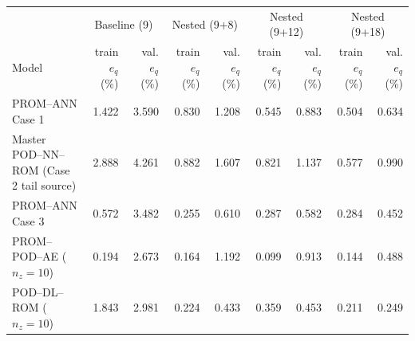 \begin{tabular}{lrr|rr|rr|rr}
\toprule
& \multicolumn{2}{c|}{Baseline (9)} & \multicolumn{2}{c|}{Nested (9+8)} & \multicolumn{2}{c|}{Nested (9+12)} & \multicolumn{2}{c}{Nested (9+18)} \\
Model & train $e_q$ (\%) & val. $e_q$ (\%) & train $e_q$ (\%) & val. $e_q$ (\%) & train $e_q$ (\%) & val. $e_q$ (\%) & train $e_q$ (\%) & val. $e_q$ (\%) \\
\midrule
PROM--ANN Case 1 & 1.422 & 3.590 & 0.830 & 1.208 & 0.545 & 0.883 & 0.504 & 0.634 \\
Master POD--NN--ROM (Case 2 tail source) & 2.888 & 4.261 & 0.882 & 1.607 & 0.821 & 1.137 & 0.577 & 0.990 \\
PROM--ANN Case 3 & 0.572 & 3.482 & 0.255 & 0.610 & 0.287 & 0.582 & 0.284 & 0.452 \\
PROM--POD--AE ($n_z=10$) & 0.194 & 2.673 & 0.164 & 1.192 & 0.099 & 0.913 & 0.144 & 0.488 \\
POD--DL--ROM ($n_z=10$) & 1.843 & 2.981 & 0.224 & 0.433 & 0.359 & 0.453 & 0.211 & 0.249 \\
\bottomrule
\end{tabular}
